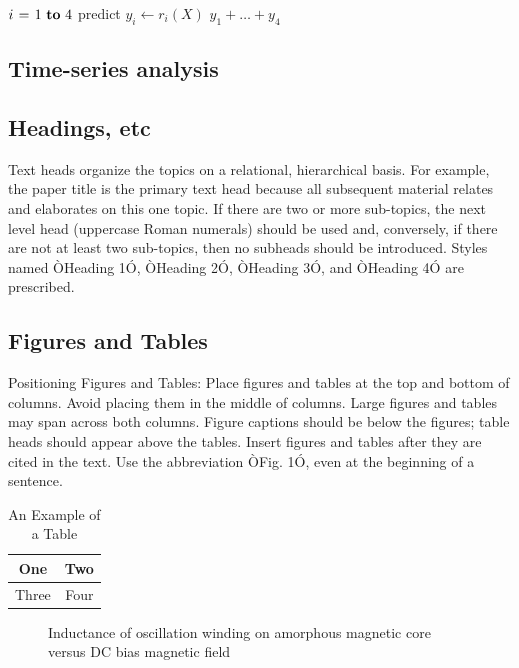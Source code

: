 \documentclass[letterpaper, 10 pt, conference]{ieeeconf}  %
\begin{document}
\begin{codebox}
  \li \For $i \gets 1 \To 4$ \Do
    \li predict $y_i \gets r_i(X)$
  \End
  \li \Return $y_1 + \dots + y_4$
\end{codebox}

\subsection{Time-series analysis}

\subsection{Headings, etc}

Text heads organize the topics on a relational, hierarchical basis. For example, the paper title is the primary text head because all subsequent material relates and elaborates on this one topic. If there are two or more sub-topics, the next level head (uppercase Roman numerals) should be used and, conversely, if there are not at least two sub-topics, then no subheads should be introduced. Styles named ÒHeading 1Ó, ÒHeading 2Ó, ÒHeading 3Ó, and ÒHeading 4Ó are prescribed.

\subsection{Figures and Tables}

Positioning Figures and Tables: Place figures and tables at the top and bottom of columns. Avoid placing them in the middle of columns. Large figures and tables may span across both columns. Figure captions should be below the figures; table heads should appear above the tables. Insert figures and tables after they are cited in the text. Use the abbreviation ÒFig. 1Ó, even at the beginning of a sentence.

\begin{table}[h]
\caption{An Example of a Table}
\label{table_example}
\begin{center}
\begin{tabular}{|c||c|}
\hline
One & Two\\
\hline
Three & Four\\
\hline
\end{tabular}
\end{center}
\end{table}


   \begin{figure}[thpb]
      \centering
      \caption{Inductance of oscillation winding on amorphous
       magnetic core versus DC bias magnetic field}
      \label{figurelabel}
   \end{figure}
   
\end{document}
